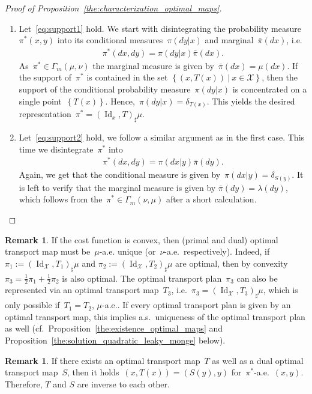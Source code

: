\documentclass{article}
\theoremstyle{definition}
\newtheorem{remark}[theorem]{Remark}
\DeclareMathOperator{\Id}{Id}
\begin{document}
\begin{proof}[Proof of Proposition~\ref{the:characterization_optimal_maps}]

\begin{enumerate}
    \item[(i)] Let~\eqref{eq:support1} hold. We start with disintegrating the probability measure~$\pi^*(x,y)$ into its conditional measures~$\pi(dy|x)$ and marginal~$\bar \pi(dx)$, i.e.
        \begin{align*}
            \pi^* (dx, dy) = \pi(dy|x) \bar \pi(d x).
        \end{align*}
        As~$\pi^* \in \Gamma_m(\mu, \nu)$ the marginal measure is given by~$\bar \pi(d x) = \mu(d x)$. If the support of~$\pi^*$ is contained in the set $\left\{ (x,T(x)) \ | \ x \in \mathcal{X} \right\}$, then the support of the conditional probability measure~$\pi(dy|x)$ is concentrated on a single point~$\left\{ T(x)\right\}$. Hence,~$\pi(dy|x) = \delta_{T(x)}$. This yields the desired representation~$\pi^* = (\Id_x , T)_{\sharp} \mu$.

        \item[(ii)] Let~\eqref{eq:support2} hold, we follow a similar argument as in the first case. This time we disintegrate~$\pi^*$ into
        \begin{align*}
            \pi^* (dx, dy) = \pi(dx| y) \bar \pi(d y).
        \end{align*}
        Again, we get that the conditional measure is given by~$\pi(dx|y) = \delta_{S(y)}$. It is left to verify that the marginal measure is given by $\bar \pi (dy) = \lambda(dy)$, which follows from the~$\pi^* \in \Gamma_{m} (\nu, \mu)$ after a short calculation.
\end{enumerate}
\end{proof}

    \begin{remark}\label{rem:uniqueness_via_optimal_transport_maps}
        If the cost function is convex, then (primal and dual) optimal transport map must be~$\mu$-a.e. unique (or~$\nu$-a.e.~respectively). Indeed, if~$\pi_1 := (\Id_{\mathcal{X}}, T_1)_{\sharp} \mu$ and $\pi_2 := (\Id_{\mathcal{X}}, T_2)_{\sharp} \mu$ are optimal, then by convexity $\pi_3 = \frac{1}{2} \pi_1 + \frac{1}{2} \pi_2$ is also optimal. The optimal transport plan~$\pi_3$ can also be represented via an optimal transport map~$T_3$, i.e.~$\pi_3 = (\Id_{\mathcal{X} }, T_3)_{\sharp} \mu$, which is only possible if~$T_1= T_2$, $\mu$-a.e.. If every optimal transport plan is given by an optimal transport map, this implies a.s.~uniqueness of the optimal transport plan as well (cf.~Proposition~\ref{the:existence_optimal_maps} and Proposition~\ref{the:solution_quadratic_leaky_monge} below).  
    \end{remark}
    \begin{remark}
        If there exists an optimal transport map~$T$ as well as a dual optimal transport map~$S$, then it holds~$(x,T(x))= (S(y), y)$ for~$\pi^*$-a.e.~$(x,y)$. Therefore, $T$ and $S$ are inverse to each other.
    \end{remark}
\end{document}

